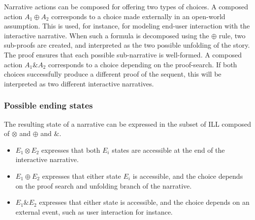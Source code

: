 \documentclass[runningheads,a4paper]{llncs}
\begin{document}
Narrative actions can be composed for offering two types of choices. A composed action $A_{1} \oplus A_{2}$ corresponds to a choice made externally in an open-world assumption. This is used, for instance, for modeling end-user interaction with the interactive narrative. When such a formula is decomposed using the $\oplus$ rule, two sub-proofs are created, and interpreted as the two possible unfolding of the story. The proof ensures that each possible sub-narrative is well-formed. A composed action $A_{1} \& A_{2}$ corresponds to a choice depending on the proof-search. If both choices successfully produce a different proof of the sequent, this will be interpreted as two different interactive narratives.
\subsubsection{Possible ending states}
The resulting state of a narrative can be expressed in the subset of ILL composed of $\otimes$ and $\oplus$ and $\&$. 
\begin{itemize}
\item $E_{1} \otimes E_{2}$ expresses that both $E_{i}$ states are accessible at the end of the interactive narrative.
\item $E_{1} \oplus E_{2}$ expresses that either state $E_{i}$ is accessible, and the choice depends on the proof search and unfolding branch of the narrative.
\item $E_{1} \& E_{2}$ expresses that either state is accessible, and the choice depends on an external event, such as user interaction for instance. 
\end{itemize}
\end{document}
